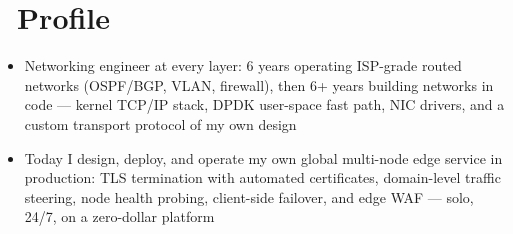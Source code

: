 \documentclass{resume}
\begin{document}



\section{\faRocket\ Profile}
\begin{itemize}[parsep=0.5ex]
	\item Networking engineer at every layer: 6 years operating ISP-grade routed networks (OSPF/BGP, VLAN, firewall), then 6+ years building networks in code --- kernel TCP/IP stack, DPDK user-space fast path, NIC drivers, and a custom transport protocol of my own design
	\item Today I design, deploy, and operate my own global multi-node edge service in production: TLS termination with automated certificates, domain-level traffic steering, node health probing, client-side failover, and edge WAF --- solo, 24/7, on a zero-dollar platform
\end{itemize}
\end{document}
